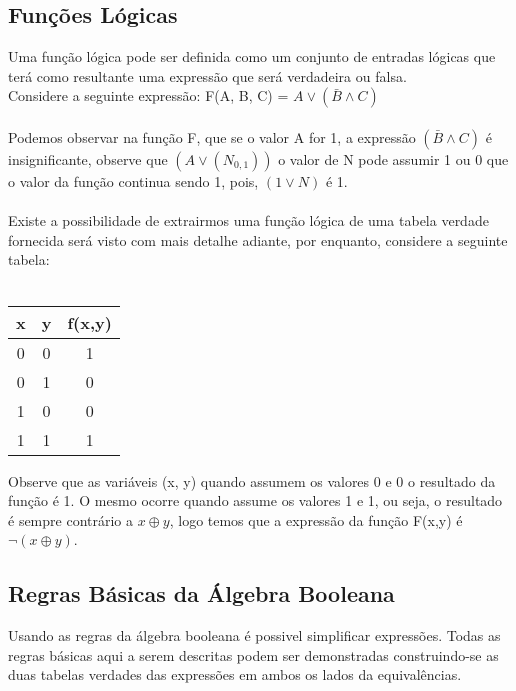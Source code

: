\documentclass[12pt, onecolumn]{article}
\begin{document}
		\subsection{Funções Lógicas}
	
	Uma função lógica pode ser definida como um conjunto de entradas lógicas
	que terá como resultante uma expressão que será verdadeira ou falsa.\\
	Considere a seguinte expressão: F(A, B, C) = $A \lor (\bar{B} \land C)$\\
	\\
	Podemos observar na função F, que se o valor A for 1, a expressão 
	$(\bar{B} \land C)$ é insignificante, observe que $(A \lor (N_{0,1}))$ 
	o valor de N pode assumir 1 ou 0 que o valor da função continua sendo 1, 
	pois, $(1 \lor N)$ é 1.\\
	\\
	
	Existe a possibilidade de extrairmos uma função lógica de uma tabela 
	verdade fornecida será visto com mais detalhe adiante, por enquanto,
	considere a seguinte tabela:\\
	\\
	\begin{table}[ht]
		\centering
		\begin{tabular}{|c|c|c|}
			\hline
			x & y & f(x,y)\\ \hline

			0 & 0 & 1 \\ \hline
			0 & 1 & 0 \\ \hline
			1 & 0 & 0 \\ \hline
			1 & 1 & 1 \\ \hline 
		\end{tabular}
	\end{table}

	Observe que as variáveis (x, y) quando assumem os valores 0 e 0
	o resultado da função é 1. O mesmo ocorre quando assume os valores
	1 e 1, ou seja, o resultado é sempre contrário a $x \oplus y$, logo 
	temos que a expressão da função F(x,y) é $\lnot (x \oplus y)$.

		\subsection{Regras Básicas da Álgebra Booleana}

	Usando as regras da álgebra booleana é possivel simplificar expressões.
	Todas as regras básicas aqui a serem descritas podem ser demonstradas 
	construindo-se as duas tabelas verdades das expressões em ambos os
	lados da equivalências.\\
\end{document}
